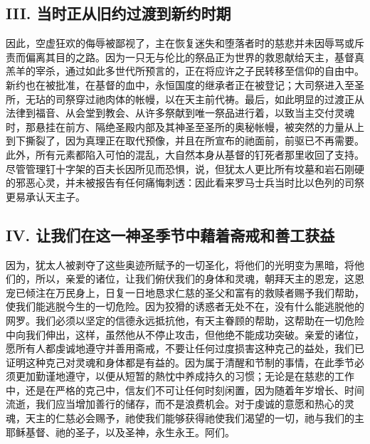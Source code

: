 
\subsection{III. 当时正从旧约过渡到新约时期}

因此，空虚狂欢的侮辱被鄙视了，主在恢复迷失和堕落者时的慈悲并未因辱骂或斥责而偏离其目的之路。因为一只无与伦比的祭品正为世界的救恩献给天主，基督真羔羊的宰杀，通过如此多世代所预言的，正在将应许之子民转移至信仰的自由中。新约也在被批准，在基督的血中，永恒国度的继承者正在被登记；大司祭进入至圣所，无玷的司祭穿过祂肉体的帐幔，以在天主前代祷。最后，如此明显的过渡正从法律到福音、从会堂到教会、从许多祭献到唯一祭品进行着，以致当主交付灵魂时，那悬挂在前方、隔绝圣殿内部及其神圣至圣所的奥秘帐幔，被突然的力量从上到下撕裂了，因为真理正在取代预像，并且在所宣布的祂面前，前驱已不再需要。此外，所有元素都陷入可怕的混乱，大自然本身从基督的钉死者那里收回了支持。尽管管理钉十字架的百夫长因所见而恐惧，说，但犹太人更比所有坟墓和岩石刚硬的邪恶心灵，并未被报告有任何痛悔刺透：因此看来罗马士兵当时比以色列的司祭更易承认天主子。\par


\subsection{IV. 让我们在这一神圣季节中藉着斋戒和善工获益}

因为，犹太人被剥夺了这些奥迹所赋予的一切圣化，将他们的光明变为黑暗，将他们的，所以，亲爱的诸位，让我们俯伏我们的身体和灵魂，朝拜天主的恩宠，这恩宠已倾注在万民身上，日复一日地恳求仁慈的圣父和富有的救赎者赐予我们帮助，使我们能逃脱今生的一切危险。因为狡猾的诱惑者无处不在，没有什么能逃脱他的网罗。我们必须以坚定的信德永远抵抗他，有天主眷顾的帮助，这帮助在一切危险中向我们伸出，这样，虽然他从不停止攻击，但他绝不能成功突破。亲爱的诸位，愿所有人都虔诚地遵守并善用斋戒，不要让任何过度损害这种克己的益处，我们已证明这种克己对灵魂和身体都是有益的。因为属于清醒和节制的事情，在此季节必须更加勤谨地遵守，以便从短暂的熱忱中养成持久的习惯；无论是在慈悲的工作中，还是在严格的克己中，信友们不可让任何时刻闲置，因为随着年岁增长、时间流逝，我们应当增加善行的储存，而不是浪费机会。对于虔诚的意愿和热心的灵魂，天主的仁慈必会赐予，祂使我们能够获得祂使我们渴望的一切，祂与我们的主耶稣基督、祂的圣子，以及圣神，永生永王。阿们。\par


